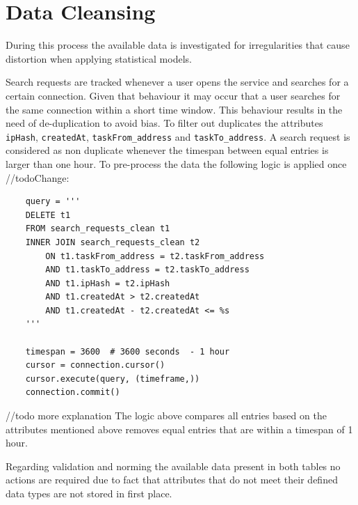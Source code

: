 \section{Data Cleansing}
\label{sec:data_cleansing}
During this process the available data is investigated for irregularities that cause distortion when applying statistical models. 

Search requests are tracked whenever a user opens the service and searches for a certain connection. Given that behaviour it may occur that a user searches for the same connection within a short time window. This behaviour results in the need of de-duplication to avoid bias. To filter out duplicates the attributes \verb|ipHash|, \verb|createdAt|, \verb|taskFrom_address| and \verb|taskTo_address|. A search request is considered as non duplicate whenever the timespan between equal entries is larger than one hour. 
To pre-process the data the following logic is applied once //todoChange: 
\begin{lstlisting}
    query = '''
    DELETE t1
    FROM search_requests_clean t1
    INNER JOIN search_requests_clean t2
        ON t1.taskFrom_address = t2.taskFrom_address
        AND t1.taskTo_address = t2.taskTo_address
        AND t1.ipHash = t2.ipHash
        AND t1.createdAt > t2.createdAt
        AND t1.createdAt - t2.createdAt <= %s
	'''

    timespan = 3600  # 3600 seconds  - 1 hour
    cursor = connection.cursor()
    cursor.execute(query, (timeframe,))
    connection.commit()
\end{lstlisting}

//todo more explanation
The logic above compares all entries based on the attributes mentioned above removes equal entries that are within a timespan of 1 hour. 

Regarding validation and norming the available data present in both tables no actions are required due to fact that attributes that do not meet their defined data types are not stored in first place. 

